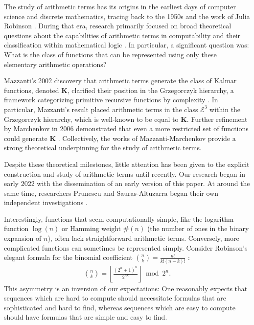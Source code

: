 \documentclass[10pt,a4paper]{article}
\theoremstyle{plain}
\begin{document}
The study of arithmetic terms has its origins in the earliest days of computer science and discrete mathematics, tracing back to the 1950s and the work of Julia Robinson \cite{robinson1952arithmetic}. During that era, research primarily focused on broad theoretical questions about the capabilities of arithmetic terms in computability and their classification within mathematical logic \cite{herman1969elementary, grzegorczyk1953someclasses, robinson1952arithmetic}. In particular, a significant question was: What is the class of functions that can be represented using only these elementary arithmetic operations?

Mazzanti's 2002 discovery that arithmetic terms generate the class of Kalmar functions, denoted $\textbf{K}$, clarified their position in the Grzegorczyk hierarchy, a framework categorizing primitive recursive functions by complexity \cite{mazzanti2002plainbases, grzegorczyk1953someclasses}. In particular, Mazzanti's result placed arithmetic terms in the class $\mathcal{E}^3$ within the Grzegorczyk hierarchy, which is well-known to be equal to $\textbf{K}$. Further refinement by Marchenkov in 2006 demonstrated that even a more restricted set of functions could generate $\textbf{K}$ \cite{marchenkov2007superposition}. Collectively, the works of Mazzanti-Marchenkov provide a strong theoretical underpinning for the study of arithmetic terms.

Despite these theoretical milestones, little attention has been given to the explicit construction and study of arithmetic terms until recently. Our research began in early 2022 with the dissemination of an early version of this paper. At around the same time, researchers Prunescu and Sauras-Altuzarra began their own independent investigations \cite{prunescu2024factorial,prunescu2024representation}.

Interestingly, functions that seem computationally simple, like the logarithm function $\log(n)$ or Hamming weight $\#(n)$ (the number of ones in the binary expansion of $n$), often lack straightforward arithmetic terms. Conversely, more complicated functions can sometimes be represented simply. Consider Robinson's elegant formula for the binomial coefficient $\binom{n}{k} = \frac{n!}{k!(n-k)!}$ \cite{robinson1952arithmetic}:
\begin{align*}
\binom{n}{k} = \left\lfloor\frac{(2^n+1)^n}{2^{n k}}\right\rfloor \bmod{2^{n}} .
\end{align*}
This asymmetry is an inversion of our expectations: One reasonably expects that sequences which are hard to compute should necessitate formulas that are sophisticated and hard to find, whereas sequences which are easy to compute should have formulas that are simple and easy to find.
\end{document}
